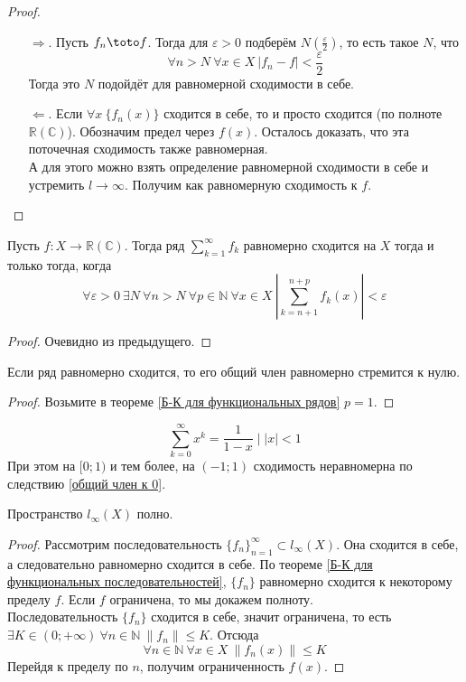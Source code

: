 \documentclass{article}
\let\eps\varepsilon
\begin{document}
    \begin{proof}
        \begin{itemize}
            \item[$\Rightarrow$.] Пусть $f_n\toto f$. Тогда для $\eps>0$ подберём $N(\frac\eps2)$, то есть такое $N$, что
            $$
            \forall n>N~\forall x\in X~|f_n-f|<\frac\eps2
            $$
            Тогда это $N$ подойдёт для равномерной сходимости в себе.
            \item[$\Leftarrow$.] Если $\forall x~\{f_n(x)\}$ сходится в себе, то и просто сходится (по полноте $\mathbb R(\mathbb C)$). Обозначим предел через $f(x)$. Осталось доказать, что эта поточечная сходимость также равномерная.\\
            А для этого можно взять определение равномерной сходимости в себе и устремить $l\to\infty$. Получим как равномерную сходимость к $f$.
        \end{itemize}
    \end{proof}
    \begin{theorem}
        \label{Б-К для функциональных рядов}
        Пусть $f\colon X\to\mathbb R(\mathbb C)$. Тогда ряд $\sum\limits_{k=1}^\infty f_k$ равномерно сходится на $X$ тогда и только тогда, когда
        $$
        \forall\eps>0~\exists N~\forall n>N~\forall p\in\mathbb N~\forall x\in X~\left|\sum\limits_{k=n+1}^{n+p}f_k(x)\right|<\eps
        $$
    \end{theorem}
    \begin{proof}
        Очевидно из предыдущего.
    \end{proof}
    \begin{corollary}
        \label{общий член к 0}
        Если ряд равномерно сходится, то его общий член равномерно стремится к нулю.
    \end{corollary}
    \begin{proof}
        Возьмите в теореме \ref{Б-К для функциональных рядов} $p=1$.
    \end{proof}
    \begin{example}
        $$\sum\limits_{k=0}^\infty x^k=\frac1{1-x}\mid |x|<1$$
        При этом на $[0;1)$ и тем более, на $(-1;1)$ сходимость неравномерна по следствию \ref{общий член к 0}.
    \end{example}
    \begin{theorem}
        Пространство $l_\infty(X)$ полно.
    \end{theorem}
    \begin{proof}
        Рассмотрим последовательность $\{f_n\}_{n=1}^\infty\subset l_\infty(X)$. Она сходится в себе, а следовательно равномерно сходится в себе. По теореме \ref{Б-К для функциональных последовательностей}, $\{f_n\}$ равномерно сходится к некоторому пределу $f$. Если $f$ ограничена, то мы докажем полноту.\\
        Последовательность $\{f_n\}$ сходится в себе, значит ограничена, то есть $\exists K\in(0;+\infty)~\forall n\in\mathbb N~\|f_n\|\leqslant K$. Отсюда
        $$
        \forall n\in\mathbb N~\forall x\in X~\|f_n(x)\|\leqslant K
        $$
        Перейдя к пределу по $n$, получим ограниченность $f(x)$.
    \end{proof}
\end{document}
